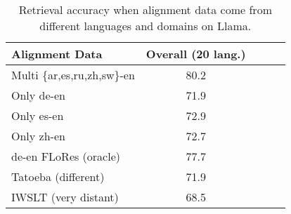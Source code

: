 \begin{table}[t]
    \small
    \centering
    \setlength\tabcolsep{15pt}
    \begin{tabular}{l c c c c}
    \toprule
    \textbf{Alignment Data}
    & \textbf{Overall} (20 lang.)
    \\
    \midrule
    Multi \{ar,es,ru,zh,{sw}\}-en &
    80.2
    \\
    \phantom{00}Only de-en  &
    71.9
    \\
    \phantom{00}Only es-en &
    72.9
    \\
    \phantom{00}Only zh-en &
    72.7
    \\
    \midrule
    de-en FLoRes (oracle) & 
    77.7
    \\
    \phantom{00}Tatoeba (different) &
    71.9
    \\
    \phantom{00}IWSLT (very distant) &
    68.5
    \\
    \bottomrule
    \end{tabular}
    \caption{Retrieval accuracy when alignment data come from different languages and domains on Llama. \label{tab:generalization}}
\end{table}
